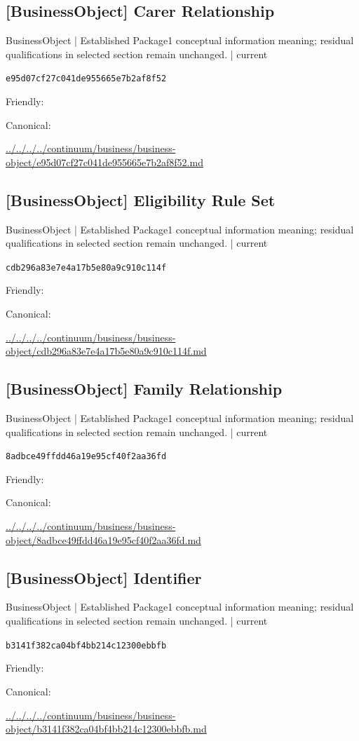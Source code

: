 \documentclass[10pt,a4paper]{article}
\begin{document}
\subsection*{[BusinessObject] Carer Relationship}
{\small BusinessObject | Established Package1 conceptual information meaning; residual qualifications in selected section remain unchanged. | current}\par
\texttt{e95d07cf27c041de955665e7b2af8f52}\par
Friendly: \par
Canonical: \par
{\footnotesize\url{../../../../continuum/business/business-object/e95d07cf27c041de955665e7b2af8f52.md}}\par
\subsection*{[BusinessObject] Eligibility Rule Set}
{\small BusinessObject | Established Package1 conceptual information meaning; residual qualifications in selected section remain unchanged. | current}\par
\texttt{cdb296a83e7e4a17b5e80a9c910c114f}\par
Friendly: \par
Canonical: \par
{\footnotesize\url{../../../../continuum/business/business-object/cdb296a83e7e4a17b5e80a9c910c114f.md}}\par
\subsection*{[BusinessObject] Family Relationship}
{\small BusinessObject | Established Package1 conceptual information meaning; residual qualifications in selected section remain unchanged. | current}\par
\texttt{8adbce49ffdd46a19e95cf40f2aa36fd}\par
Friendly: \par
Canonical: \par
{\footnotesize\url{../../../../continuum/business/business-object/8adbce49ffdd46a19e95cf40f2aa36fd.md}}\par
\subsection*{[BusinessObject] Identifier}
{\small BusinessObject | Established Package1 conceptual information meaning; residual qualifications in selected section remain unchanged. | current}\par
\texttt{b3141f382ca04bf4bb214c12300ebbfb}\par
Friendly: \par
Canonical: \par
{\footnotesize\url{../../../../continuum/business/business-object/b3141f382ca04bf4bb214c12300ebbfb.md}}\par
\end{document}
